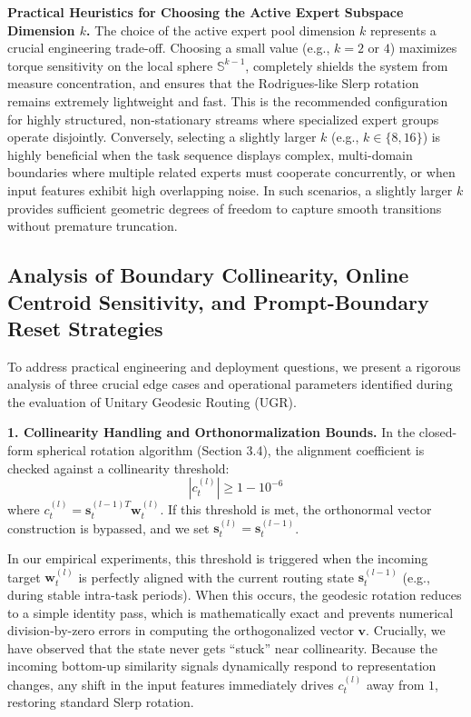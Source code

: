 \documentclass{article}
\theoremstyle{plain}
\theoremstyle{definition}
\theoremstyle{remark}
\begin{document}
\textbf{Practical Heuristics for Choosing the Active Expert Subspace Dimension $k$.} The choice of the active expert pool dimension $k$ represents a crucial engineering trade-off. Choosing a small value (e.g., $k=2$ or $4$) maximizes torque sensitivity on the local sphere $\mathbb{S}^{k-1}$, completely shields the system from measure concentration, and ensures that the Rodrigues-like Slerp rotation remains extremely lightweight and fast. This is the recommended configuration for highly structured, non-stationary streams where specialized expert groups operate disjointly. Conversely, selecting a slightly larger $k$ (e.g., $k \in \{8, 16\}$) is highly beneficial when the task sequence displays complex, multi-domain boundaries where multiple related experts must cooperate concurrently, or when input features exhibit high overlapping noise. In such scenarios, a slightly larger $k$ provides sufficient geometric degrees of freedom to capture smooth transitions without premature truncation.

\subsection{Analysis of Boundary Collinearity, Online Centroid Sensitivity, and Prompt-Boundary Reset Strategies}
\label{appendix:edge_cases}
To address practical engineering and deployment questions, we present a rigorous analysis of three crucial edge cases and operational parameters identified during the evaluation of Unitary Geodesic Routing (UGR).

\textbf{1. Collinearity Handling and Orthonormalization Bounds.} 
In the closed-form spherical rotation algorithm (Section 3.4), the alignment coefficient is checked against a collinearity threshold:
\begin{equation}
|c_t^{(l)}| \ge 1 - 10^{-6}
\end{equation}
where $c_t^{(l)} = \mathbf{s}_t^{(l-1) T} \mathbf{w}_t^{(l)}$. If this threshold is met, the orthonormal vector construction is bypassed, and we set $\mathbf{s}_t^{(l)} = \mathbf{s}_t^{(l-1)}$. 

In our empirical experiments, this threshold is triggered when the incoming target $\mathbf{w}_t^{(l)}$ is perfectly aligned with the current routing state $\mathbf{s}_t^{(l-1)}$ (e.g., during stable intra-task periods). When this occurs, the geodesic rotation reduces to a simple identity pass, which is mathematically exact and prevents numerical division-by-zero errors in computing the orthogonalized vector $\mathbf{v}$. Crucially, we have observed that the state never gets ``stuck'' near collinearity. Because the incoming bottom-up similarity signals dynamically respond to representation changes, any shift in the input features immediately drives $c_t^{(l)}$ away from $1$, restoring standard Slerp rotation.
\end{document}
